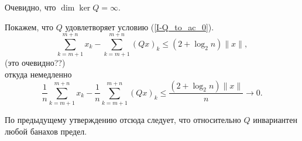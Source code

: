 Очевидно, что $\dim \ker Q = \infty$.

Покажем, что $Q$ удовлетворяет условию (\ref{I-Q_to_ac_0}).
\begin{equation}
	\sum_{k=m+1}^{m+n} x_k - \sum_{k=m+1}^{m+n} (Qx)_k \leqslant (2 + \log_2 n) \|x\|,
\end{equation}
(это очевидно??)\\
откуда немедленно
\begin{equation}
	\frac{1}{n}\sum_{k=m+1}^{m+n} x_k - \frac{1}{n}\sum_{k=m+1}^{m+n} (Qx)_k \leqslant \frac{(2 + \log_2 n) \|x\|}{n} \to 0.
\end{equation}

По предыдущему утверждению отсюда следует, что относительно $Q$ инвариантен любой банахов предел.
